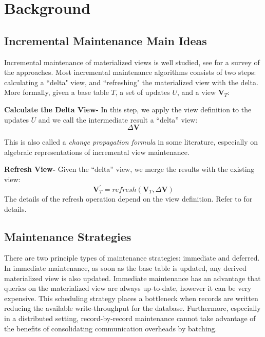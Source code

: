\section{Background}\label{sec-background}

\subsection{Incremental Maintenance Main Ideas}
Incremental maintenance of materialized views is well studied, see \cite{chirkova2011materialized} for a survey of the approaches. 
Most incremental maintenance algorithms consists of two steps: calculating a ``delta" view,
and ``refreshing" the materialized view with the delta.
More formally, given a base table $T$, a set of updates $U$,
and a view $\textbf{V}_{T}$:

\textbf{Calculate the Delta View- }
In this step, we apply the view definition to the updates $U$ and we call
the intermediate result a ``delta'' view:
\[
\Delta\textbf{V}
\]

This is also called a \emph{change propagation formula} in some literature,
especially on algebraic representations of incremental view maintenance.

\textbf{Refresh View- }
Given the ``delta'' view, we merge the results with the existing
view:
\[
\textbf{V}_{T}^{'}=refresh(\textbf{V}_{T},\Delta\textbf{V})
\] 
The details of the refresh operation depend on the view definition.
Refer to \cite{chirkova2011materialized} for details.


\subsection{Maintenance Strategies}
There are two principle types of maintenance strategies: immediate and deferred. 
In immediate maintenance, as soon as the base table is updated, 
any derived materialized view is also updated.
Immediate maintenance has an advantage that queries on the materialized view are always up-to-date, 
however it can be very expensive.
This scheduling strategy places a bottleneck when records are written reducing 
the available write-throughput for the database.
Furthermore, especially in a distributed setting, record-by-record 
maintenance cannot take advantage of the benefits of consolidating communication overheads by batching.

